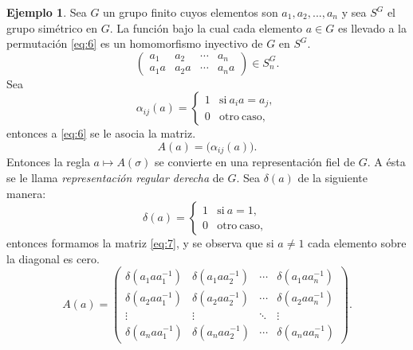 \documentclass[12pt]{book}
\theoremstyle{definition}
\newtheorem{example}[theorem]{Ejemplo}
\newcounter{in}
\newcounter{ini}
\begin{document}
\begin{example}
  \label{Ej4}
  Sea $G$ un grupo finito cuyos elementos son $a_{1},a_{2},...,a_{n}$
  y sea $S^{G}$ el grupo simétrico en $G$. La función bajo la cual
  cada elemento $a \in G$ es llevado a la permutación \ref{eq:6} es un
  homomorfismo inyectivo de $G$ en $S^{G}$.
  \begin{equation}
    \label{eq:6}
    \begin{pmatrix}
      a_{1} & a_{2} & \cdots  & a_{n}\\
      a_{1}a & a_{2}a & \cdots & a_{n}a
    \end{pmatrix} 
    \in S_{n}^{G}.
  \end{equation}
  Sea
  \begin{equation*}
    \alpha_{ij} (a) = \left\{
      \begin{array}{ll}
        1      & \mathrm{si\ } a_{i}a = a_{j}, \\
        0      & \mathrm{otro\ caso,\ }
      \end{array}
    \right. 
  \end{equation*}
  entonces a \ref{eq:6} se le asocia la matriz. 
  \begin{equation*}
    A(a)=\big(\alpha_{ij}(a)\big).
  \end{equation*} 
  Entonces la regla $a \mapsto A\left(\sigma\right)$ se convierte en
  una representación fiel de $G$. A ésta se le llama \emph{representación
  regular derecha} de $G$. Sea $\delta{(a)}$ de la siguiente manera:
  \begin{equation*}
    \delta{(a)} = \left\{
      \begin{array}{ll}
        1      & \mathrm{si\ } a = 1, \\
        0      & \mathrm{otro\ caso,\ } 
      \end{array}
    \right.
  \end{equation*}
  entonces formamos la matriz \ref{eq:7}, y se observa que si
  $a \neq 1$ cada elemento sobre la diagonal es cero.
  \begin{equation}
    \label{eq:7}
    A\left(a\right) = 
    \begin{pmatrix}
      \delta\left(a_{1}aa_{1}^{-1}\right) & \delta\left(a_{1}aa_{2}^{-1}\right) & \cdots  & \delta\left(a_{1}aa_{n}^{-1}\right)\\
      \delta\left(a_{2}aa_{1}^{-1}\right) & \delta\left(a_{2}aa_{2}^{-1}\right) & \cdots  & \delta\left(a_{2}aa_{n}^{-1}\right)\\ 
      \vdots & \vdots & \ddots & \vdots\\
      \delta\left(a_{n}aa_{1}^{-1}\right) & \delta\left(a_{n}aa_{2}^{-1}\right) & \cdots  & \delta\left(a_{n}aa_{n}^{-1}\right)
    \end{pmatrix}
    .
  \end{equation}


\end{example}
\end{document}
